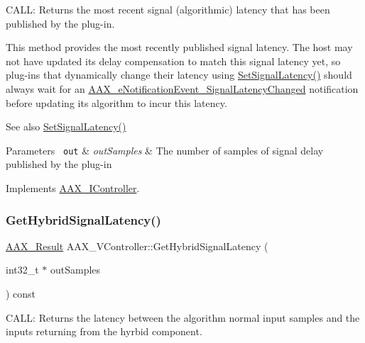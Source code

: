 C\+A\+LL\+: Returns the most recent signal (algorithmic) latency that has been published by the plug-\/in. 

This method provides the most recently published signal latency. The host may not have updated its delay compensation to match this signal latency yet, so plug-\/ins that dynamically change their latency using \mbox{\hyperlink{a01789_af2c648879419d94971c1308d8698601f}{Set\+Signal\+Latency()}} should always wait for an \mbox{\hyperlink{a00491_afab5ea2cfd731fc8f163b6caa685406ea06ab4b075ecb523d0dde3ec19b76a756}{A\+A\+X\+\_\+e\+Notification\+Event\+\_\+\+Signal\+Latency\+Changed}} notification before updating its algorithm to incur this latency.

\begin{DoxySeeAlso}{See also}
\mbox{\hyperlink{a01789_af2c648879419d94971c1308d8698601f}{Set\+Signal\+Latency()}}
\end{DoxySeeAlso}

\begin{DoxyParams}[1]{Parameters}
\mbox{\texttt{ out}}  & {\em out\+Samples} & The number of samples of signal delay published by the plug-\/in \\
\hline
\end{DoxyParams}


Implements \mbox{\hyperlink{a01789_ad50aa6fd54e39623a58debd63d9551e1}{A\+A\+X\+\_\+\+I\+Controller}}.

\mbox{\label{a01905_abc03b972e785569e1a0e89a12a6ed372}} 
\subsubsection{\texorpdfstring{GetHybridSignalLatency()}{GetHybridSignalLatency()}}
{\footnotesize\ttfamily \mbox{\hyperlink{a00392_a4d8f69a697df7f70c3a8e9b8ee130d2f}{A\+A\+X\+\_\+\+Result}} A\+A\+X\+\_\+\+V\+Controller\+::\+Get\+Hybrid\+Signal\+Latency (\begin{DoxyParamCaption}\item[{int32\+\_\+t $\ast$}]{out\+Samples }\end{DoxyParamCaption}) const\hspace{0.3cm}{\ttfamily [virtual]}}



C\+A\+LL\+: Returns the latency between the algorithm normal input samples and the inputs returning from the hyrbid component. 

